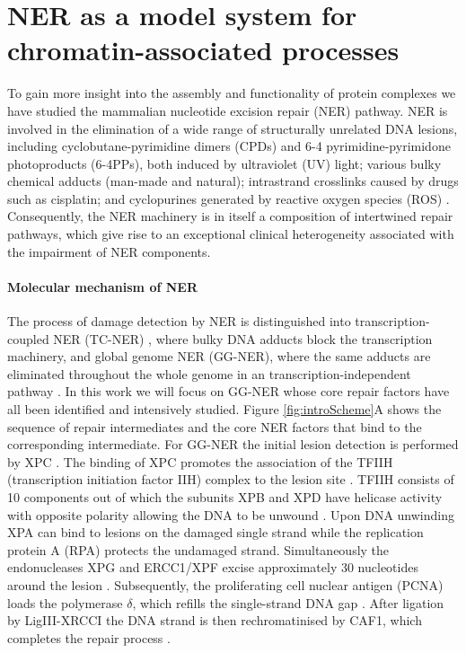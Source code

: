 \section{NER as a model system for chromatin-associated processes}
\label{sec:NERexperiments}
To gain more insight into the assembly and functionality of protein complexes we have studied the mammalian nucleotide excision repair (NER) pathway. NER is involved in the elimination of a wide range of structurally unrelated DNA lesions, including cyclobutane-pyrimidine dimers (CPDs) and 6-4 pyrimidine-pyrimidone photoproducts (6-4PPs), both induced by ultraviolet (UV) light; various bulky chemical adducts (man-made and natural); intrastrand crosslinks caused by drugs such as cisplatin; and cyclopurines generated by reactive oxygen species (ROS) \cite{Marteijn2014}. Consequently, the NER machinery is in itself a composition of intertwined repair pathways, which give rise to an exceptional clinical heterogeneity associated with the impairment of NER components. 


\paragraph{Molecular mechanism of NER}
The process of damage detection by NER is distinguished into transcription-coupled NER (TC-NER) \cite{Sugasawa:2005:Cell:15882621,Gillet:2006:Chem-Rev:16464005}, where bulky DNA adducts block the transcription machinery, and global genome NER (GG-NER), where the same adducts are eliminated throughout the whole genome in an transcription-independent pathway \cite{Fousteri2008}. In this work we will focus on GG-NER whose core repair factors have all been identified and intensively studied. Figure \ref{fig:introScheme}A shows the sequence of repair intermediates and the core NER factors that bind to the corresponding intermediate. For GG-NER the initial lesion detection is performed by XPC \cite{Sugasawa:1998:Mol-Cell:9734359,Volker2001}. The binding of XPC promotes the association of the TFIIH (transcription initiation factor IIH) complex to the lesion site \cite{Yokoi:2000:J-Biol-Chem:10734143,Riedl2003,Volker2001}. TFIIH consists of 10 components out of which the subunits XPB and XPD have helicase activity with opposite polarity allowing the DNA to be unwound \cite{Tapias2004,Compe2012}. Upon DNA unwinding XPA can bind to lesions on the damaged single strand while the replication protein A (RPA) protects the undamaged strand. Simultaneously the endonucleases XPG and ERCC1/XPF excise approximately 30 nucleotides around the lesion \cite{Evans1997,deLaat:1998:Genes-Dev:9716411,Wakasugi:1997:J-Biol-Chem:9188507,Park:2006:FEBS-J:16623697,Camenisch:2006:Nat-Struct-Mol-Biol:16491090}. Subsequently, the proliferating cell nuclear antigen (PCNA) loads the polymerase $\delta$, which refills the single-strand DNA gap \cite{Hoeijmakers:2001:Nature:11357144,Essers2005,Moser:2007:Mol-Cell:17643379}. After ligation by LigIII-XRCCI the DNA strand is then rechromatinised by CAF1, which completes the repair process \cite{Green:2003:EMBO-J:14517254,Polo2006} . 


